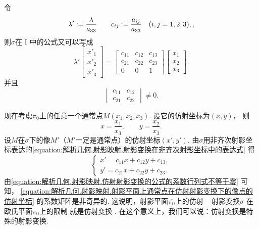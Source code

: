 令\begin{equation*}
	\lambda'
	:=
	\frac{\lambda}{a_{33}}
	\qquad
	c_{ij}
	:=
	\frac{a_{ij}}{a_{33}}
	\quad(i,j=1,2,3),,
\end{equation*}
则\(\sigma\)在 I 中的公式又可以写成\begin{equation}\label{equation:解析几何.射影映射.仿射射影变换的公式}
	\lambda'
	\begin{bmatrix}
		x'_1 \\ x'_2 \\ x'_3
	\end{bmatrix}
	= \begin{bmatrix}
		c_{11} & c_{12} & c_{13} \\
		c_{21} & c_{22} & c_{23} \\
		0 & 0 & 1
	\end{bmatrix}
	\begin{bmatrix}
		x_1 \\ x_2 \\ x_3
	\end{bmatrix}.
\end{equation}
并且\begin{equation}\label{equation:解析几何.射影映射.仿射射影变换的公式的系数行列式不等于零}
	\begin{vmatrix}
		c_{11} & c_{12} \\
		c_{21} & c_{22}
	\end{vmatrix}
	\neq 0.
\end{equation}

现在考虑\(\overline{\pi_0}\)上的任意一个通常点\(M(x_1,x_2,x_3)\).
设它的仿射坐标为\((x,y)\)，
则\begin{equation*}
	x = \frac{x_1}{x_3},
	\qquad
	y = \frac{x_2}{x_3}.
\end{equation*}
设\(M\)在\(\sigma\)下的像\(M'\)（\(M'\)一定是通常点）的仿射坐标\((x',y')\).
由\(\sigma\)用非齐次射影坐标表达的\cref{equation:解析几何.射影映射.射影变换在非齐次射影坐标中的表达式}
得\begin{equation}\label{equation:解析几何.射影映射.射影平面上通常点在仿射射影变换下的像点的仿射坐标}
	\begin{cases}
		x'
		= c_{11} x + c_{12} y + c_{13}, \\
		y'
		= c_{21} x + c_{22} y + c_{23}.
	\end{cases}
\end{equation}
由\cref{equation:解析几何.射影映射.仿射射影变换的公式的系数行列式不等于零} 可知，
\cref{equation:解析几何.射影映射.射影平面上通常点在仿射射影变换下的像点的仿射坐标} 的系数矩阵是非奇异的.
这说明，射影平面\(\overline{\pi_0}\)上的仿射 -- 射影变换\(\sigma\)
在欧氏平面\(\pi_0\)上的限制
就是仿射变换 .
在这个意义上，我们可以说：仿射变换是特殊的射影变换.
